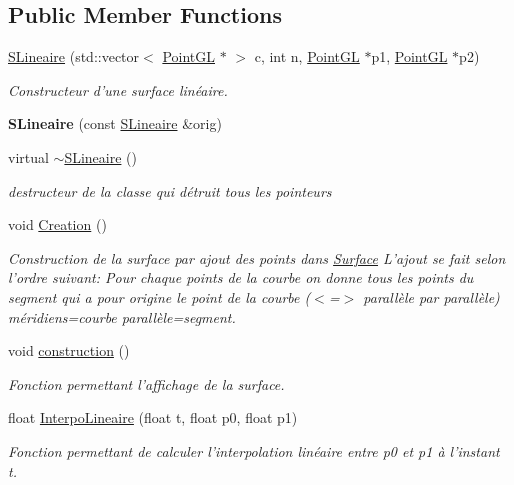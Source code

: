 \subsection*{Public Member Functions}
\begin{DoxyCompactItemize}
\item 
\hyperlink{classSLineaire_af29a55c43b2f69187e9bf7d2f01e3199}{S\-Lineaire} (std\-::vector$<$ \hyperlink{classPointGL}{Point\-G\-L} $\ast$ $>$ c, int n, \hyperlink{classPointGL}{Point\-G\-L} $\ast$p1, \hyperlink{classPointGL}{Point\-G\-L} $\ast$p2)
\begin{DoxyCompactList}\small\item\em Constructeur d'une surface linéaire. \end{DoxyCompactList}\item 
\hypertarget{classSLineaire_a99e6bd4a84347cffba0f3f5fcda2f228}{{\bfseries S\-Lineaire} (const \hyperlink{classSLineaire}{S\-Lineaire} \&orig)}\label{classSLineaire_a99e6bd4a84347cffba0f3f5fcda2f228}

\item 
\hypertarget{classSLineaire_a85d96a0221719b0397625f99dcb9d964}{virtual \hyperlink{classSLineaire_a85d96a0221719b0397625f99dcb9d964}{$\sim$\-S\-Lineaire} ()}\label{classSLineaire_a85d96a0221719b0397625f99dcb9d964}

\begin{DoxyCompactList}\small\item\em destructeur de la classe qui détruit tous les pointeurs \end{DoxyCompactList}\item 
\hypertarget{classSLineaire_a946fddfdae938c4d3ec6e91c9cb30b8c}{void \hyperlink{classSLineaire_a946fddfdae938c4d3ec6e91c9cb30b8c}{Creation} ()}\label{classSLineaire_a946fddfdae938c4d3ec6e91c9cb30b8c}

\begin{DoxyCompactList}\small\item\em Construction de la surface par ajout des points dans \hyperlink{classSurface}{Surface} L'ajout se fait selon l'ordre suivant\-: Pour chaque points de la courbe on donne tous les points du segment qui a pour origine le point de la courbe ($<$=$>$ parallèle par parallèle) méridiens=courbe parallèle=segment. \end{DoxyCompactList}\item 
\hypertarget{classSLineaire_a3c82b3b19ad80e6815ca86cbb23facb9}{void \hyperlink{classSLineaire_a3c82b3b19ad80e6815ca86cbb23facb9}{construction} ()}\label{classSLineaire_a3c82b3b19ad80e6815ca86cbb23facb9}

\begin{DoxyCompactList}\small\item\em Fonction permettant l'affichage de la surface. \end{DoxyCompactList}\item 
float \hyperlink{classSLineaire_aa50f3a000493441aa2ace64806e1ae9d}{Interpo\-Lineaire} (float t, float p0, float p1)
\begin{DoxyCompactList}\small\item\em Fonction permettant de calculer l'interpolation linéaire entre p0 et p1 à l'instant t. \end{DoxyCompactList}\end{DoxyCompactItemize}
